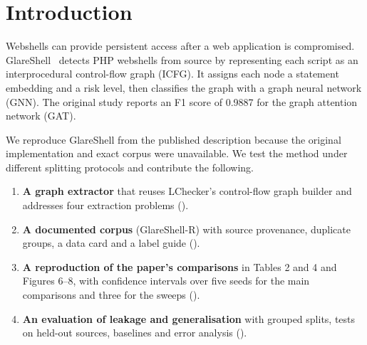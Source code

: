 \section{Introduction}\label{sec:intro}
Webshells can provide persistent access after a web application is compromised. GlareShell~\paperref{}
detects PHP webshells from source by representing each script as an interprocedural control-flow graph
(ICFG). It assigns each node a statement embedding and a risk level, then classifies the graph with a
graph neural network (GNN). The original study reports an F1 score of 0.9887 for the graph attention
network (GAT).

We reproduce GlareShell from the published description because the original implementation and exact
corpus were unavailable. We test the method under different splitting protocols and contribute the following.
\begin{enumerate}
  \item \textbf{A graph extractor} that reuses LChecker's control-flow graph builder and addresses four
        extraction problems ().
  \item \textbf{A documented corpus} (GlareShell-R) with source provenance, duplicate groups, a data card
        and a label guide ().
  \item \textbf{A reproduction of the paper's comparisons} in Tables 2 and 4 and Figures 6--8, with confidence
        intervals over five seeds for the main comparisons and three for the sweeps ().
  \item \textbf{An evaluation of leakage and generalisation} with grouped splits, tests on held-out sources,
        baselines and error analysis ().
\end{enumerate}

